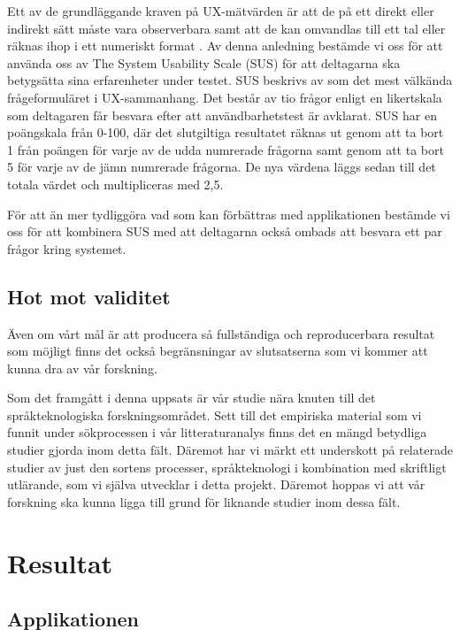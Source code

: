 \documentclass[swedish]{maucsthesis}
\begin{document}
Ett av de grundläggande kraven på UX-mätvärden är att de på ett direkt eller
indirekt sätt måste vara observerbara samt att de kan omvandlas till ett tal
eller räknas ihop i ett numeriskt format \citep{tullis:2013}. Av denna anledning
bestämde vi oss för att använda oss av The System Usability Scale (SUS) för att
deltagarna ska betygsätta sina erfarenheter under testet. SUS beskrivs av
\citep{laubheimer:2018} som det mest välkända frågeformuläret i UX-sammanhang. Det
består av tio frågor enligt en likertskala som deltagaren får besvara efter att
användbarhetstest är avklarat. SUS har en poängskala från 0-100, där det
slutgiltiga resultatet räknas ut genom att ta bort 1 från poängen för varje av
de udda numrerade frågorna samt genom att ta bort 5 för varje av de jämn
numrerade frågorna. De nya värdena läggs sedan till det totala värdet och
multipliceras med 2,5.

För att än mer tydliggöra vad som kan förbättras med applikationen bestämde vi
oss för att kombinera SUS med att deltagarna också ombads att besvara ett par
frågor kring systemet.

\subsection{Hot mot validitet}

Även om vårt mål är att producera så fullständiga och reproducerbara resultat
som möjligt finns det också begränsningar av slutsatserna som vi kommer att
kunna dra av vår forskning.

Som det framgått i denna uppsats är vår studie nära knuten till det
språkteknologiska forskningsområdet. Sett till det empiriska material som vi
funnit under sökprocessen i vår litteraturanalys finns det en mängd betydliga
studier gjorda inom detta fält. Däremot har vi märkt ett underskott på
relaterade studier av just den sortens processer, språkteknologi i kombination
med skriftligt utlärande, som vi själva utvecklar i detta projekt. Däremot
hoppas vi att vår forskning ska kunna ligga till grund för liknande studier inom
dessa fält.


\section{Resultat}
\subsection{Applikationen}
\end{document}
